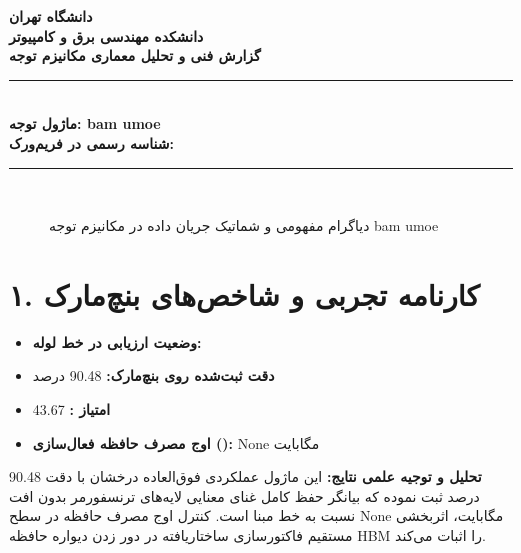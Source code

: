 \documentclass[12pt,a4paper]{article}
\begin{document}
\begin{center}
{\Large\bfseries دانشگاه تهران}\\[0.2cm]
{\large\bfseries دانشکده مهندسی برق و کامپیوتر}\\[0.2cm]
{\large\bfseries گزارش فنی و تحلیل معماری مکانیزم توجه}\\[0.5cm]
\rule{\linewidth}{1pt}\\[0.3cm]
{\LARGE\bfseries ماژول توجه: bam umoe}\\[0.2cm]
{\large \textbf{شناسه رسمی در فریم‌ورک:} }\\[0.2cm]
\rule{\linewidth}{1pt}\\[0.5cm]
\end{center}

\begin{figure}[H]
\centering
{}
\caption{دیاگرام مفهومی و شماتیک جریان داده در مکانیزم توجه bam umoe}
\end{figure}

\section*{۱. کارنامه تجربی و شاخص‌های بنچ‌مارک}
\begin{itemize}
\item \textbf{وضعیت ارزیابی در خط لوله:} 
\item \textbf{دقت ثبت‌شده روی بنچ‌مارک:} 90.48 درصد
\item \textbf{امتیاز :} 43.67
\item \textbf{اوج مصرف حافظه فعال‌سازی ():} None مگابایت
\end{itemize}
\textbf{تحلیل و توجیه علمی نتایج:} این ماژول عملکردی فوق‌العاده درخشان با دقت 90.48 درصد ثبت نموده که بیانگر حفظ کامل غنای معنایی لایه‌های ترنسفورمر بدون افت نسبت به خط مبنا است. کنترل اوج مصرف حافظه در سطح None مگابایت، اثربخشی مستقیم فاکتورسازی ساختاریافته در دور زدن دیواره حافظه HBM را اثبات می‌کند.
\end{document}
